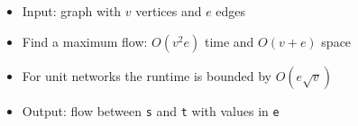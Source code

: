 \begin{itemize}
	\item Input: graph with $v$ vertices and $e$ edges
	\item Find a maximum flow: $O(v^2e)$ time and $O(v+e)$ space
	\item For unit networks the runtime is bounded by $O(e\sqrt{v})$
	\item Output: flow between \lstinline{s} and \lstinline{t} with values in \lstinline{e}
\end{itemize}
